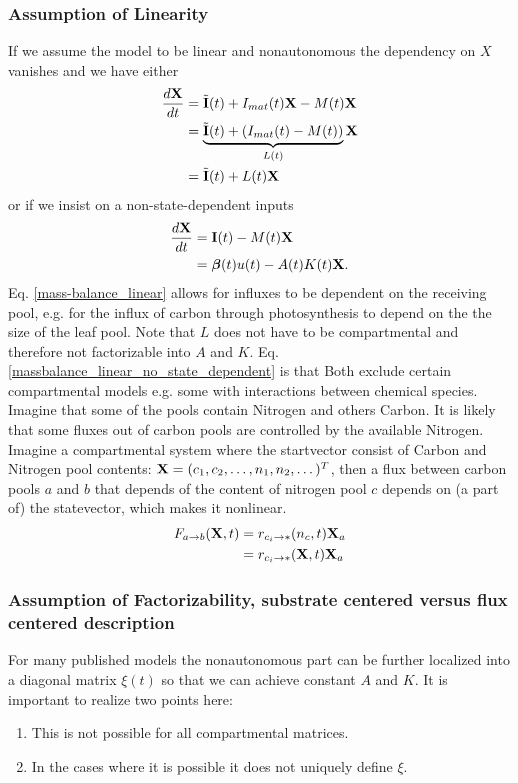 \subsubsection{Assumption of Linearity}
If we assume the model to be linear and nonautonomous the dependency on $X$ vanishes and we have
either
\begin{align}
\frac{d \mathbf{X}}{d t}
  &=\tilde{\mathbf{I}}(t)+I_{mat}(t)\mathbf{X} - M(t) \mathbf{X}  \nonumber
  \\
  &=\underbrace{\tilde{\mathbf{I}}(t)+(I_{mat}(t) - M(t))}_{L(t)} \mathbf{X} \label{massbalance_linear} \\
  &=\tilde{\mathbf{I}}(t)+L(t) \mathbf{X} \nonumber
\end{align}
or if we insist on a non-state-dependent inputs 
\begin{align}
\frac{d \mathbf{X}}{d t}
  &=\mathbf{I}(t) - M(t) \mathbf{X} \label{massbalance_linear_no_state_dependent}
  \\
  &= \bm{\beta}(t)u(t) - A(t) K(t) \mathbf{X} \nonumber .
\end{align} 
Eq. \eqref{mass-balance_linear} allows for influxes to be dependent on the receiving pool, e.g. for the influx of carbon through photosynthesis to depend on the the size of the leaf pool. Note that $L$ does not have to be compartmental and therefore not factorizable into $A$ and $K$.
Eq. \eqref{massbalance_linear_no_state_dependent} is that 
Both  exclude certain compartmental models e.g. some with interactions between chemical species. 
Imagine that some of the pools contain Nitrogen and others Carbon.
It is likely that some fluxes out of carbon pools are controlled by the
available Nitrogen.  
Imagine a compartmental system where the startvector
consist of Carbon and Nitrogen pool contents: $\mathbf{X}=(c_1,c_2,\dots,
n_1,n_2,\dots )^T$, then a flux between carbon pools $a$ and $b$ that
depends of the content of nitrogen pool $c$ depends on (a part of) the
statevector, which makes it nonlinear.
\begin{align*}
F_{a \rightarrow b} (\mathbf{X},t)  &= r_{c_i \rightarrow *}(n_c,t) \mathbf{X}_a \\
                            &= r_{c_i \rightarrow *}(\mathbf{X},t) \mathbf{X}_a
\end{align*}


\subsubsection{Assumption of Factorizability, substrate centered versus flux centered description}
For many published models the nonautonomous part  can be further localized into a diagonal matrix $\xi(t)$ so that we can achieve constant $A$ and $K$. It is important to realize two points here:
\begin{enumerate}
\item \label{substrate_xi}
  This is not possible for all compartmental matrices.
\item  \label{define_xi}
  In the cases where it is possible it does not uniquely define $\xi$.
\end{enumerate}

